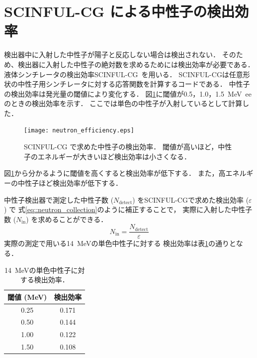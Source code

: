 \documentclass[../master]{subfiles}
\begin{document}
\section{SCINFUL-CG による中性子の検出効率}
検出器中に入射した中性子が陽子と反応しない場合は検出されない．
そのため、検出器に入射した中性子の絶対数を求めるためには検出効率が必要である．
液体シンチレータの検出効率SCINFUL-CG~\cite{scinful-cg}を用いる．
SCINFUL-CGは任意形状の中性子用シンチレータに対する応答関数を計算するコードである．
中性子の検出効率は発光量の閾値により変化する．
図\ref{fig::neutron_efficiency}に閾値が\SI{0.5}{}，\SI{1.0}{}，\SI{1.5}{\mega\electronvolt ee}のときの検出効率を示す．
ここでは単色の中性子が入射しているとして計算した．
\begin{figure}
  \centering
  \texttt{[image: neutron\_efficiency.eps]}
  \caption[SCINFUL-CG で求めた中性子の検出効率．]
          {SCINFUL-CG で求めた中性子の検出効率．
          閾値が高いほど，中性子のエネルギーが大きいほど検出効率は小さくなる．}
  \label{fig::neutron_efficiency}
\end{figure}
図\ref{fig::neutron_efficiency}から分かるように閾値を高くすると検出効率が低下する．
また，高エネルギーの中性子ほど検出効率が低下する．

中性子検出器で測定した中性子数 ($N_{\text{detect}}$) をSCINFUL-CGで求めた検出効率 ($\varepsilon$) で
式\ref{eq::neutron_collection}のように補正することで，
実際に入射した中性子数 ($N_{\text{in}}$) を求めることができる．
\begin{equation}
  N_{\text{in}} = \frac{N_{\text{detect}}}{\varepsilon}
  \label{eq::neutron_collection}
\end{equation}
実際の測定で用いる\SI{14}{\mega\electronvolt}の単色中性子に対する
検出効率は表\ref{tab::neutron_efficiency}の通りとなる．
\begin{table}
  \centering
  \caption{\SI{14}{\mega\electronvolt}の単色中性子に対する検出効率．}
  \label{tab::neutron_efficiency}
  \begin{tabular}{cc}
    \toprule
    閾値 (\si{\mega\electronvolt}) & 検出効率 \\
    \midrule
    0.25 & 0.171 \\
    0.50 & 0.144 \\
    1.00 & 0.122 \\
    1.50 & 0.108 \\
    \bottomrule
  \end{tabular}
\end{table}
\end{document}
